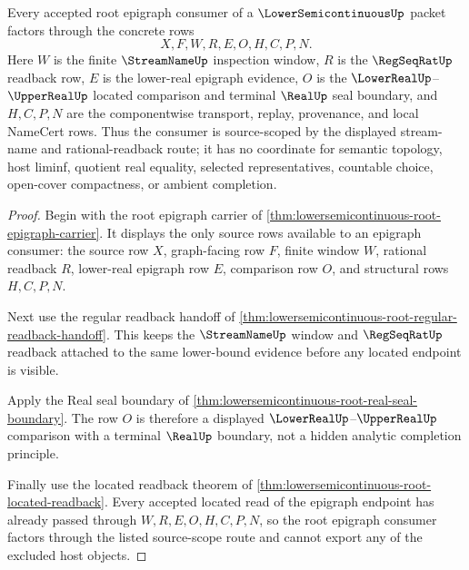 \begin{theorem}
\label{thm:lower-semicontinuous-epigraph-source-scope}
Every accepted root epigraph consumer of a $\LowerSemicontinuousUp$ packet factors through the concrete rows
$$
X,F,W,R,E,O,H,C,P,N .
$$
Here $W$ is the finite $\StreamNameUp$ inspection window, $R$ is the $\RegSeqRatUp$ readback row, $E$ is the lower-real epigraph evidence, $O$ is the $\LowerRealUp$--$\UpperRealUp$ located comparison and terminal $\RealUp$ seal boundary, and $H,C,P,N$ are the componentwise transport, replay, provenance, and local NameCert rows. Thus the consumer is source-scoped by the displayed stream-name and rational-readback route; it has no coordinate for semantic topology, host liminf, quotient real equality, selected representatives, countable choice, open-cover compactness, or ambient completion.
\end{theorem}
\begin{proof}
Begin with the root epigraph carrier of \autoref{thm:lowersemicontinuous-root-epigraph-carrier}. It displays the only source rows available to an epigraph consumer: the source row $X$, graph-facing row $F$, finite window $W$, rational readback $R$, lower-real epigraph row $E$, comparison row $O$, and structural rows $H,C,P,N$.

Next use the regular readback handoff of \autoref{thm:lowersemicontinuous-root-regular-readback-handoff}. This keeps the $\StreamNameUp$ window and $\RegSeqRatUp$ readback attached to the same lower-bound evidence before any located endpoint is visible.

Apply the Real seal boundary of \autoref{thm:lowersemicontinuous-root-real-seal-boundary}. The row $O$ is therefore a displayed $\LowerRealUp$--$\UpperRealUp$ comparison with a terminal $\RealUp$ boundary, not a hidden analytic completion principle.

Finally use the located readback theorem of \autoref{thm:lowersemicontinuous-root-located-readback}. Every accepted located read of the epigraph endpoint has already passed through $W,R,E,O,H,C,P,N$, so the root epigraph consumer factors through the listed source-scope route and cannot export any of the excluded host objects.
\end{proof}

